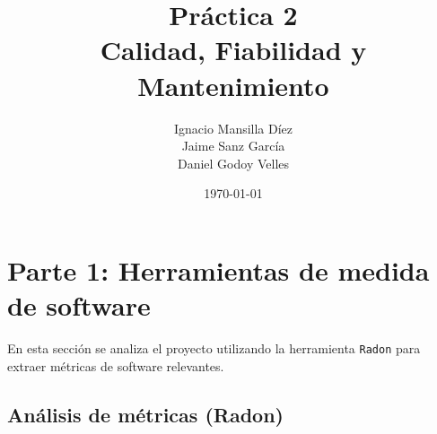 \documentclass{article}
\begin{document}
\title{Práctica 2\\Calidad, Fiabilidad y Mantenimiento}

\author{
  \begin{tabular}{c}
    Ignacio Mansilla Díez \\[0.2cm]
    Jaime Sanz García \\[0.2cm]
    Daniel Godoy Velles
  \end{tabular}
}

\date{\today}



\maketitle


\newpage

\tableofcontents
\newpage

\section{Parte 1: Herramientas de medida de software}
En esta sección se analiza el proyecto utilizando la herramienta \texttt{Radon} para extraer métricas de software relevantes.

\subsection{Análisis de métricas (Radon)}
\end{document}

